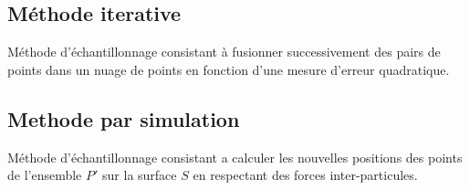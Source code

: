 \subsection{Méthode iterative}
\begin{definition}
  Méthode d'échantillonnage consistant à fusionner successivement des pairs de points dans un nuage de points en fonction d'une mesure d'erreur quadratique.
\end{definition}

\subsection{Methode par simulation}
\begin{definition}
  Méthode d'échantillonnage consistant a calculer les nouvelles positions des points de l'ensemble $P'$ sur la surface $S$ en respectant des forces inter-particules.
\end{definition}